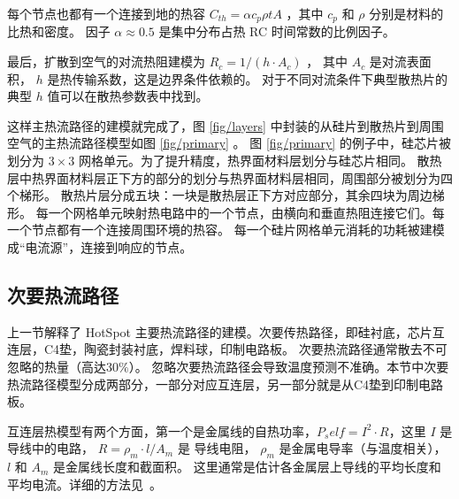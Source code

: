 每个节点也都有一个连接到地的热容 $C_{th} = \alpha c_p \rho t A$ ，其中 $c_p$ 和 $\rho$ 分别是材料的比热和密度。
因子  $\alpha \approx 0.5$ 是集中分布占热 RC 时间常数的比例因子。

最后，扩散到空气的对流热阻建模为 $R_c = 1/(h\cdot A_c)$ ， 其中 $A_c$ 是对流表面积， $h$ 是热传输系数，这是边界条件依赖的。
对于不同对流条件下典型散热片的典型 $h$ 值可以在散热参数表中找到。

这样主热流路径的建模就完成了，图 \ref{fig/layers} 中封装的从硅片到散热片到周围空气的主热流路径模型如图 \ref{fig/primary} 。 
图 \ref{fig/primary} 的例子中，硅芯片被划分为 $3 \times 3$ 网格单元。为了提升精度，热界面材料层划分与硅芯片相同。
散热层中热界面材料层正下方的部分的划分与热界面材料层相同，周围部分被划分为四个梯形。
散热片层分成五块：一块是散热层正下方对应部分，其余四块为周边梯形。
每一个网格单元映射热电路中的一个节点，由横向和垂直热阻连接它们。每一个节点都有一个连接周围环境的热容。
每一个硅片网格单元消耗的功耗被建模成“电流源”，连接到响应的节点。

\subsection{次要热流路径}\label{sec:secondary}

上一节解释了 HotSpot 主要热流路径的建模。次要传热路径，即硅衬底，芯片互连层，C4垫，陶瓷封装衬底，焊料球，印制电路板。
次要热流路径通常散去不可忽略的热量（高达$30\%$）。
忽略次要热流路径会导致温度预测不准确。本节中次要热流路径模型分成两部分，一部分对应互连层，另一部分就是从C4垫到印制电路板。

互连层热模型有两个方面，第一个是金属线的自热功率，$P_self = I^2\cdot R$，这里 $I$ 是导线中的电路，
$R = \rho_m \cdot l/A_m$ 是 导线电阻， $\rho_m$ 是金属电导率（与温度相关）， $l$ 和 $A_m$ 是金属线长度和截面积。
这里通常是估计各金属层上导线的平均长度和平均电流。详细的方法见~\cite{huang2004compact}。




























